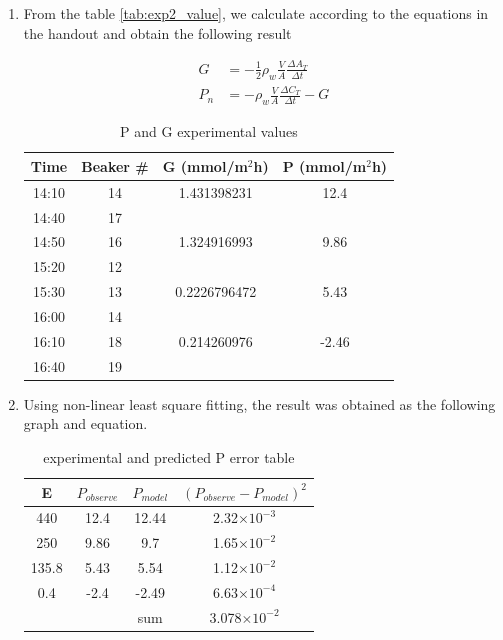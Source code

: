 \documentclass[a4paper]{report}
\begin{document}
\begin{enumerate}
    \item From the table \ref{tab:exp2_value}, we calculate according to the equations in the handout and obtain the following result
    
    \begin{align*}
        G &= -\frac{1}{2}\rho_w\frac{V}{A}\frac{\Delta A_T}{\Delta t} \\
        P_n &= -\rho_w\frac{V}{A}\frac{\Delta C_T}{\Delta t} - G
    \end{align*}
    
\begin{table}[H]
\centering
\begin{tabular}{|c|c|c|c|}
\hline
Time  & Beaker \# & G (mmol/m$^2$h)                           & P (mmol/m$^2$h)                     \\ \hline
14:10 & 14        & {1.431398231}  & {12.4}  \\ \cline{1-2}
14:40 & 17        &                               &                        \\ \hline
14:50 & 16        & {1.324916993}  & {9.86}  \\ \cline{1-2}
15:20 & 12        &                               &                        \\ \hline
15:30 & 13        & {0.2226796472} & {5.43}  \\ \cline{1-2}
16:00 & 14        &                               &                        \\ \hline
16:10 & 18        & {0.214260976}  & {-2.46} \\ \cline{1-2}
16:40 & 19        &                               &                        \\ \hline
\end{tabular}
\caption{P and G experimental values}
\label{tab:PG_value}
\end{table}
    
    \item Using non-linear least square fitting, the result was obtained as the following graph and equation.
    \begin{table}[H]
        \centering
        \begin{tabular}{|c|c|c|c|}\hline
            E & $P_{observe}$ & $P_{model}$ & $(P_{observe} - P_{model})^2$ \\\hline
            440 & 12.4 & 12.44 & 2.32$\times 10^{-3}$ \\\hline
            250 & 9.86 & 9.7 & 1.65$\times 10^{-2}$ \\\hline
            135.8 & 5.43 & 5.54 & 1.12$\times 10^{-2}$ \\\hline
            0.4 & -2.4 & -2.49 & 6.63$\times 10^{-4}$ \\\hline
            \multicolumn{1}{c}{} & \multicolumn{1}{c|}{} & sum & 3.078$\times 10^{-2}$ \\\cline{3-4}
        \end{tabular}
        \caption{experimental and predicted P error table}
        \label{tab:my_label}
    \end{table}


\end{enumerate}
\end{document}
